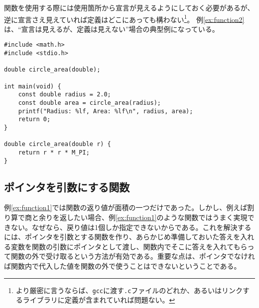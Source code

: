 関数を使用する際には使用箇所から宣言が見えるようにしておく必要があるが、逆に宣言さえ見えていれば定義はどこにあっても構わない\footnote{より厳密に言うならば、\texttt{gcc}に渡す\texttt{.c}ファイルのどれか、あるいはリンクするライブラリに定義が含まれていれば問題ない。}。
例\ref{ex:function2}は、``宣言は見えるが、定義は見えない''場合の典型例になっている。

\begin{reidai}\label{ex:function2}
    \begin{verbatim}
#include <math.h>
#include <stdio.h>

double circle_area(double);

int main(void) {
    const double radius = 2.0;
    const double area = circle_area(radius);
    printf("Radius: %lf, Area: %lf\n", radius, area);
    return 0;
}

double circle_area(double r) {
    return r * r * M_PI;
}
\end{verbatim}
\end{reidai}

\subsection{ポインタを引数にする関数}

例\ref{ex:function1}では関数の返り値が面積の一つだけであった。しかし、例えば割り算で商と余りを返したい場合、例\ref{ex:function1}のような関数ではうまく実現できない。なぜなら、戻り値は1個しか指定できないからである。これを解決するには、ポインタを引数とする関数を作り、あらかじめ準備しておいた答えを入れる変数を関数の引数にポインタとして渡し、関数内でそこに答えを入れてもらって関数の外で受け取るという方法が有効である。重要な点は、ポインタでなければ関数内で代入した値を関数の外で使うことはできないということである。

